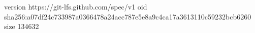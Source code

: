 version https://git-lfs.github.com/spec/v1
oid sha256:a07df24c733987a0366478a24acc787e5e8a9c4ca17a3613110c59232bcb6260
size 134632
